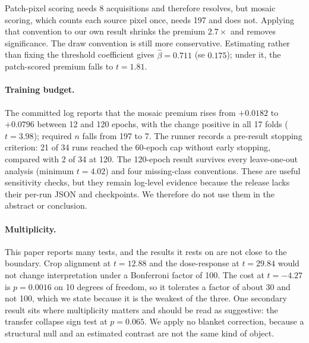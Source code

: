Patch-pixel scoring needs 8 acquisitions and therefore resolves, but mosaic scoring,
which counts each source pixel once, needs 197 and does not. Applying that convention
to our own result shrinks the premium $2.7\times$ and removes significance. The draw
convention is still more conservative. Estimating rather than fixing the threshold
coefficient gives $\hat\beta=0.711$ (se $0.175$); under it, the patch-scored premium
falls to $t=1.81$.

\paragraph{Training budget.} The committed log reports that the mosaic premium rises
from $+0.0182$ to $+0.0796$ between 12 and 120 epochs, with the change positive in all
17 folds ($t=3.98$); required $n$ falls from 197 to 7. The runner records a
pre-result stopping criterion: 21 of 34 runs reached the 60-epoch cap without early
stopping, compared with 2 of 34 at 120. The 120-epoch result survives every
leave-one-out analysis (minimum $t=4.02$) and four missing-class conventions. These
are useful sensitivity checks, but they remain log-level evidence because the
release lacks their per-run JSON and checkpoints. We therefore do not use them in
the abstract or conclusion.

\paragraph{Multiplicity.} This paper reports many tests, and the results it rests on
are not close to the boundary. Crop alignment at $t = 12.88$ and the dose-response at
$t = 29.84$ would not change interpretation under a Bonferroni factor of 100. The cost
at $t = -4.27$ is $p = 0.0016$ on 10 degrees of freedom, so it tolerates a factor of
about 30 and not 100, which we state because it is the weakest of the three. One
secondary result sits where multiplicity matters and should be read as suggestive: the
transfer collapse sign test at $p = 0.065$. We apply no blanket correction, because a
structural null and an estimated contrast are not the same kind of object.
